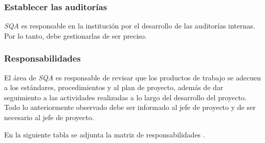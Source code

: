 \subsubsection{Establecer las auditorías}

\textit{SQA} es responsable en la institución por el desarrollo de las auditorías internas. Por lo tanto, debe gestionarlas de ser preciso.

\subsubsection{Responsabilidades}

El área de \textit{SQA} es responsable de revisar que los productos de trabajo se adecuen a los estándares, procedimientos y al plan de proyecto, además de dar seguimiento a las actividades realizadas a lo largo del desarrollo del proyecto. Todo lo anteriormente observado debe ser informado al jefe de proyecto y de ser necesario al jefe de proyecto.

En la siguiente tabla se adjunta la matriz de responsabilidades \citet{web00}.

